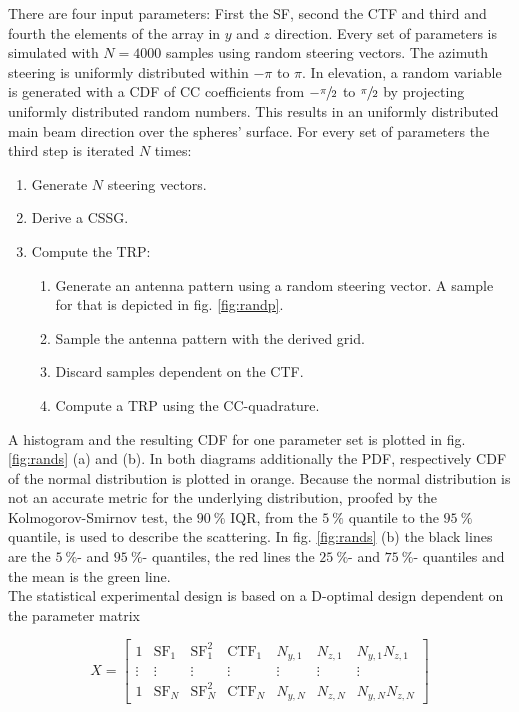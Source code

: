 There are four input parameters: First the \ac{SF}, second the \ac{CTF} and third and fourth the elements of the array in $y$ and $z$ direction. Every set of parameters is simulated with $N=4000$ samples using random steering vectors. The azimuth steering is uniformly distributed within $-\pi$ to $\pi$. In elevation, a random variable is generated with a \ac{CDF} of \ac{CC} coefficients from $-\sfrac{\pi}{2}$ to $\sfrac{\pi}{2}$ by projecting uniformly distributed random numbers. This results in an uniformly distributed main beam direction over the spheres' surface. For every set of parameters the third step is iterated $N$ times:

\begin{enumerate}
\item Generate $N$ steering vectors.
\item Derive a \ac{CSSG}.
\item Compute the \ac{TRP}:
\begin{enumerate}
\item Generate an antenna pattern using a random steering vector. A sample for that is depicted in fig. \ref{fig:randp}.
\item Sample the antenna pattern with the derived grid.
\item Discard samples dependent on the \ac{CTF}.
\item Compute a \ac{TRP} using the \ac{CC}-quadrature.
\end{enumerate}
\end{enumerate}

A histogram and the resulting \ac{CDF} for one parameter set is plotted in fig. \ref{fig:rands} (a) and (b). In both diagrams additionally the \ac{PDF}, respectively \ac{CDF} of the normal distribution is plotted in orange. Because the normal distribution is not an accurate metric for the underlying distribution, proofed by the Kolmogorov-Smirnov test, the $\SI{90}{\percent}$ \ac{IQR}, from the $\SI{5}{\percent}$ quantile to the $\SI{95}{\percent}$ quantile, is used to describe the scattering. In fig. \ref{fig:rands} (b) the black lines are the $\SI{5}{\percent}$- and $\SI{95}{\percent}$- quantiles, the red lines the $\SI{25}{\percent}$- and $\SI{75}{\percent}$- quantiles and the mean is the green line.\\
The statistical experimental design is based on a D-optimal design dependent on the parameter matrix

\begin{equation}
X = \begin{bmatrix}
1 & \text{SF}_1 & \text{SF}_1^2 & \text{CTF}_1 & N_{y,1} & N_{z,1} & N_{y,1}N_{z,1}\\
\vdots & \vdots & \vdots & \vdots & \vdots & \vdots & \vdots\\
1 & \text{SF}_N & \text{SF}_N^2 & \text{CTF}_N & N_{y,N} & N_{z,N} & N_{y,N}N_{z,N}
\end{bmatrix}
\label{eq:parammatrix}
\end{equation}


